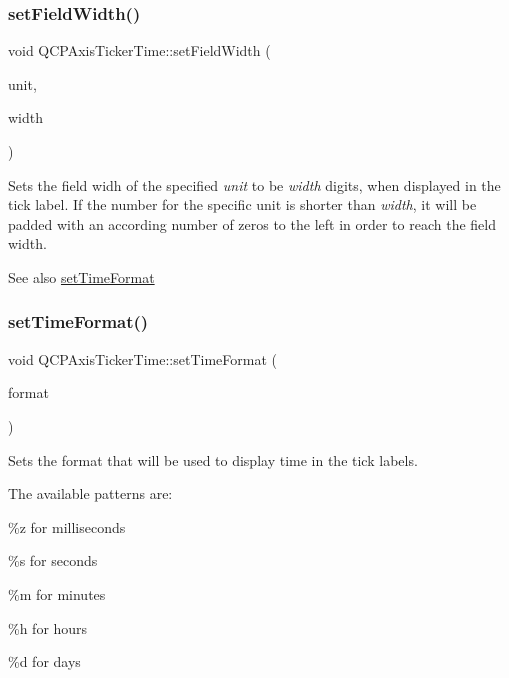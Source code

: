 \subsubsection{\texorpdfstring{set\+Field\+Width()}{setFieldWidth()}}
{\footnotesize\ttfamily void Q\+C\+P\+Axis\+Ticker\+Time\+::set\+Field\+Width (\begin{DoxyParamCaption}\item[{\hyperlink{class_q_c_p_axis_ticker_time_a5c48ded8c6d3a1aca9b68219469fea3e}{Q\+C\+P\+Axis\+Ticker\+Time\+::\+Time\+Unit}}]{unit,  }\item[{int}]{width }\end{DoxyParamCaption})}

Sets the field widh of the specified {\itshape unit} to be {\itshape width} digits, when displayed in the tick label. If the number for the specific unit is shorter than {\itshape width}, it will be padded with an according number of zeros to the left in order to reach the field width.

\begin{DoxySeeAlso}{See also}
\hyperlink{class_q_c_p_axis_ticker_time_a2f30b6e5125bce4256be9ce3177088ea}{set\+Time\+Format} 
\end{DoxySeeAlso}
\mbox{\label{class_q_c_p_axis_ticker_time_a2f30b6e5125bce4256be9ce3177088ea}} 
\subsubsection{\texorpdfstring{set\+Time\+Format()}{setTimeFormat()}}
{\footnotesize\ttfamily void Q\+C\+P\+Axis\+Ticker\+Time\+::set\+Time\+Format (\begin{DoxyParamCaption}\item[{const Q\+String \&}]{format }\end{DoxyParamCaption})}

Sets the format that will be used to display time in the tick labels.

The available patterns are\+:
\begin{DoxyItemize}
\item \%z for milliseconds
\item \%s for seconds
\item \%m for minutes
\item \%h for hours
\item \%d for days
\end{DoxyItemize}

